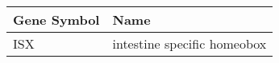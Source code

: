 \begin{tabular}{ll}
\toprule
Gene Symbol &                        Name \\
\midrule
        ISX & intestine specific homeobox \\
\bottomrule
\end{tabular}
